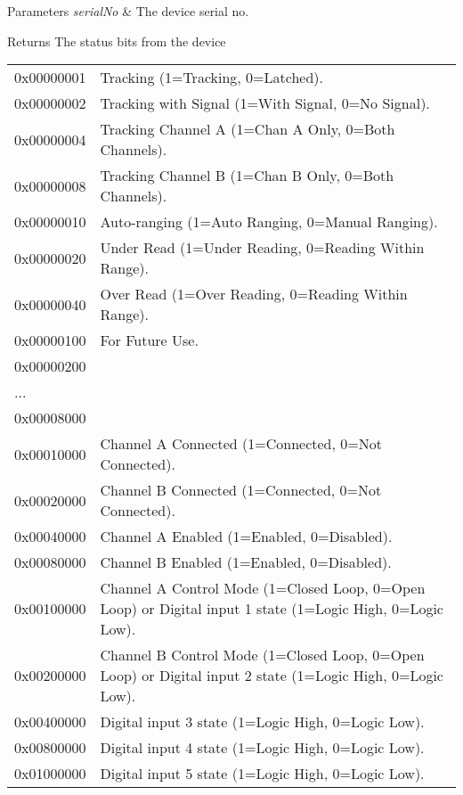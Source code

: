 \begin{DoxyParams}{Parameters}
{\em serial\+No} & The device serial no. \\
\hline
\end{DoxyParams}
\begin{DoxyReturn}{Returns}
The status bits from the device \tabulinesep=1mm
\begin{longtabu} spread 0pt [c]{*2{|X[-1]}|}
\hline
0x00000001&Tracking (1=Tracking, 0=Latched). \\
0x00000002&Tracking with Signal (1=With Signal, 0=No Signal). \\
0x00000004&Tracking Channel A (1=Chan A Only, 0=Both Channels). \\
0x00000008&Tracking Channel B (1=Chan B Only, 0=Both Channels). \\
0x00000010&Auto-\/ranging (1=Auto Ranging, 0=Manual Ranging). \\
0x00000020&Under Read (1=Under Reading, 0=Reading Within Range). \\
0x00000040&Over Read (1=Over Reading, 0=Reading Within Range). \\
0x00000100&For Future Use. \\
0x00000200&\\
...&\\
0x00008000&\\
0x00010000&Channel A Connected (1=Connected, 0=Not Connected). \\
0x00020000&Channel B Connected (1=Connected, 0=Not Connected). \\
0x00040000&Channel A Enabled (1=Enabled, 0=Disabled). \\
0x00080000&Channel B Enabled (1=Enabled, 0=Disabled). \\
0x00100000&Channel A Control Mode (1=Closed Loop, 0=Open Loop) or Digital input 1 state (1=Logic High, 0=Logic Low). \\
0x00200000&Channel B Control Mode (1=Closed Loop, 0=Open Loop) or Digital input 2 state (1=Logic High, 0=Logic Low). \\
0x00400000&Digital input 3 state (1=Logic High, 0=Logic Low). \\
0x00800000&Digital input 4 state (1=Logic High, 0=Logic Low). \\
0x01000000&Digital input 5 state (1=Logic High, 0=Logic Low). \\

\end{longtabu}
\end{DoxyReturn}
